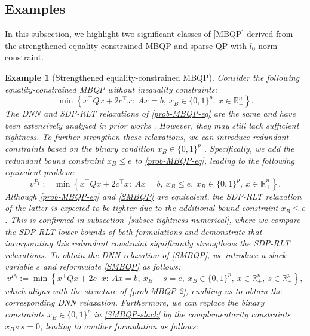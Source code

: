\documentclass[11pt]{article}
\theoremstyle{plain}
\newtheorem{example}{Example}
\def\R{\mathbb{R}}
\begin{document}

\subsection{Examples}\label{subsec-application}

In this subsection, we highlight two significant classes of \eqref{MBQP}
derived from the strengthened equality-constrained MBQP 
and sparse QP with $l_0$-norm constraint. 
%
\begin{example}[Strengthened equality-constrained MBQP]\label{example-SMBQP}
Consider the following equality-constrained MBQP without inequality constraints:
\begin{equation}\label{prob-MBQP-eq}
\min\left\{x^{\top} Q x+2 c^{\top}x : \ Ax=b,\ x_B\in\{0,1\}^{p},\ x\in \R^{n}_+\right\}.
\tag{MBQP-E}
\end{equation}
The DNN and SDP-RLT relaxations of \eqref{prob-MBQP-eq} are the same and have been extensively analyzed in prior works \cite{RiNNAL,bomze2017fresh,burer2010optimizing}. However, they may still lack sufficient tightness. To further strengthen these relaxations, we can introduce redundant constraints based on the binary condition $x_B\in\{0,1\}^p$ \cite{padberg1989boolean,locatelli2024fix}. Specifically, we add the redundant bound constraint $x_B\leq e$ to \eqref{prob-MBQP-eq}, leading to the following equivalent problem:
\begin{equation}\label{SMBQP}
v^{P_1}:=\min\left\{x^{\top} Q x+2 c^{\top}x : \ Ax=b,\ x_B\leq e,\ x_B\in\{0,1\}^{p},\ x\in \R^{n}_+\right\}.\tag{SMBQP-E}
\end{equation}
Although \eqref{prob-MBQP-eq} and \eqref{SMBQP} are equivalent, the SDP-RLT relaxation of the latter is expected to be tighter due to the additional bound constraint $ x_B \leq e $. This is confirmed in subsection~\ref{subsec-tightness-numerical}, where we compare the SDP-RLT lower bounds of both formulations and demonstrate that incorporating this redundant constraint significantly strengthens the SDP-RLT relaxations.
To obtain the DNN relaxation of \eqref{SMBQP}, we introduce a slack variable $s$ and reformulate \eqref{SMBQP} as follows:
\begin{equation}\label{SMBQP-slack}
v^{P_2}:=\min\left\{x^{\top} Q x+2 c^{\top}x : \ Ax=b,\ x_B+s= e,\ x_B\in\{0,1\}^{p},\ x\in \R^{n}_+,\ s\in\R_+^{p}\right\},
\end{equation}
which aligns with the structure of \eqref{prob-MBQP-2}, enabling us to obtain the corresponding DNN relaxation. Furthermore, we can replace the binary constraints $x_B\in\{0,1\}^{p}$ in \eqref{SMBQP-slack} by the complementarity constraints $x_B\circ s=0$, leading to another formulation as follows:

\end{example}
\end{document}
